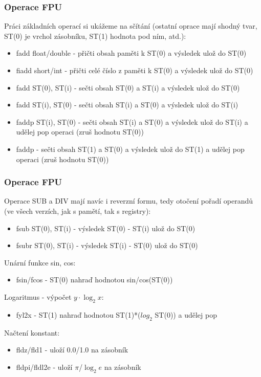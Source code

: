 \documentclass{beamer}
\begin{document}
\begin{frame}
\frametitle{Operace FPU}
Práci základních operací si ukážeme na sčítání (ostatní oprace mají shodný tvar, ST(0) je vrchol zásobníku, ST(1) hodnota pod ním, atd.):
\begin{itemize}
\item fadd float/double - přičti obsah paměti k ST(0) a výsledek ulož do ST(0)
\item fiadd short/int - přičti celé číslo z paměti k ST(0) a výsledek ulož do ST(0)
\item fadd ST(0), ST(i) - sečti obsah ST(0) a ST(i) a výsledek ulož do ST(0)
\item fadd ST(i), ST(0) - sečti obsah ST(i) a ST(0) a výsledek ulož do ST(i)
\item faddp ST(i), ST(0) - sečti obsah ST(i) a ST(0) a výsledek ulož do ST(i) a udělej pop operaci (zruš hodnotu ST(0))
\item faddp - sečti obsah ST(1) a ST(0) a výsledek ulož do ST(1) a udělej pop operaci (zruš hodnotu ST(0))
\end{itemize}
\end{frame}


\begin{frame}
\frametitle{Operace FPU}
Operace SUB a DIV mají navíc i reverzní formu, tedy otočení pořadí operandů (ve všech verzích, jak s pamětí, tak s registry):
\begin{itemize}
\item fsub ST(0), ST(i) - výsledek ST(0) - ST(i) ulož do ST(0)
\item fsubr ST(0), ST(i) - výsledek ST(i) - ST(0) ulož do ST(0)
\end{itemize}

Unární funkce sin, cos:
\begin{itemize}
\item fsin/fcos - ST(0) nahraď hodnotou sin/cos(ST(0))
\end{itemize}

Logaritmus - výpočet $y\cdot\log_2 x$:
\begin{itemize}
\item fyl2x - ST(1) nahraď hodnotou ST(1)*($log_2$ ST(0)) a udělej pop
\end{itemize}

Načtení konstant:
\begin{itemize}
\item fldz/fld1 - uloží 0.0/1.0 na zásobník 
\item fldpi/fldl2e - uloží $\pi$/$\log_2 e$ na zásobník 
\end{itemize}

\end{frame}
\end{document}
